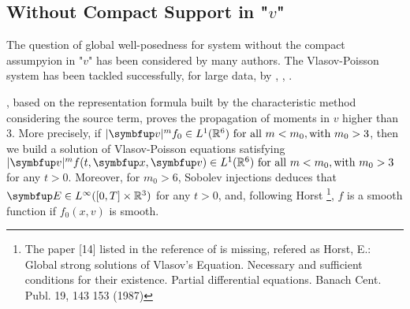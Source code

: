 {%


  

\subsection{Without Compact Support in "$v$"}


The question of global well-posedness for \eqvp system without the compact assumpyion in "$v$" has been considered by many authors. The Vlasov-Poisson system has been tackled successfully, for large data, by
\cite{pfaffelmoser_global_1992}, \cite{1991InMat.105..415L}, \cite{schaeffer_global_1991}.



\cite{1991InMat.105..415L}, based on the representation formula built by the characteristic method considering the source term, proves the propagation of moments in $v$ higher than 3.
More precisely, if $|\vv|^m f_0\in L^1(\bbR^6)\text{ for all }m<m_0,\text{with } m_0> 3$, then we build a solution
of Vlasov-Poisson equations satisfying $|\vv|^m \ftxv\in L^1(\bbR^6)\text{ for all }m<m_0,\text{with } m_0> 3$ for any $t>0$. Moreover, for $m_0>6$, Sobolev injections  deduces that $\vE\in L^\infty( [0, T]\times \bbRRR )$ for any $t>0$, and,
following Horst \footnote{The paper [14] listed in the reference of \cite{1991InMat.105..415L} is missing, refered as Horst, E.: Global strong solutions of Vlasov's Equation. Necessary and sufficient conditions
for their existence. Partial differential equations. Banach Cent. Publ. 19, 143 153 (1987)}, $f$ is a smooth function if $f_0(x, v)$ is smooth. 



}

